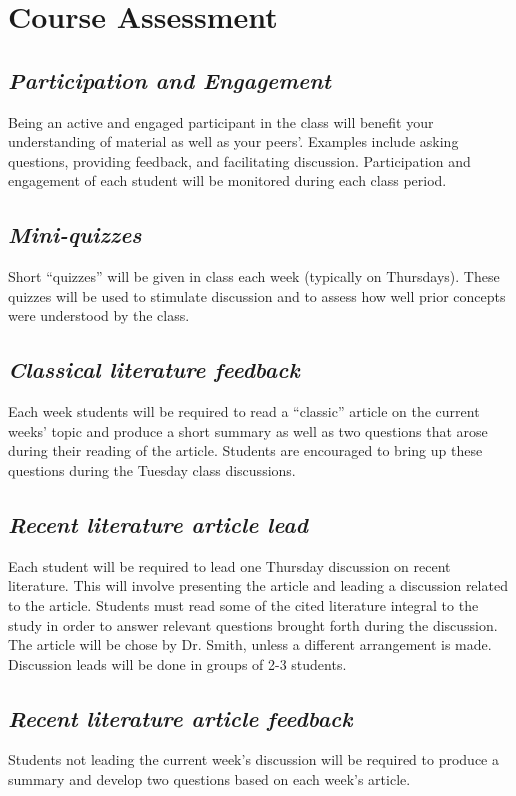 \documentclass[12pt, notitlepage]{article}   	%
\begin{document}
{\section{Course Assessment}
\subsection{\textit{Participation and Engagement}}
Being an active and engaged participant in the class will benefit your understanding
of material as well as your peers'. Examples include asking questions, providing feedback,
and facilitating discussion. Participation and engagement of each student will be monitored
during each class period.

\subsection{\textit{Mini-quizzes}}
Short “quizzes” will be given in class each week (typically on Thursdays). 
These quizzes will be used to stimulate discussion and to assess how well 
prior concepts were understood by the class.

\subsection{\textit{Classical literature feedback}}
Each week students will be required to read a “classic” article on the current weeks’ 
topic and produce a short summary as well as two questions that arose during their 
reading of the article. Students are encouraged to bring up these questions during the
Tuesday class discussions.

\subsection{\textit{Recent literature article lead}}
Each student will be required to lead one Thursday discussion on recent literature. 
This will involve presenting the article 
and leading a discussion related to the article. Students must read some of the cited
literature integral to the study 
in order to answer relevant questions brought forth during the discussion.
The article will be chose by Dr. Smith, unless a different arrangement is made.
Discussion leads will be done in groups of 2-3 students.

\subsection{\textit{Recent literature article feedback}}
Students not leading the current week’s 
discussion will be required to produce a summary and 
develop two questions based on each week’s article.

}
\end{document}

